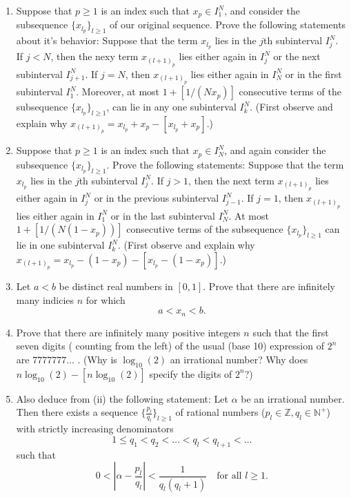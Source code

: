 \documentclass[11pt]{article}
\begin{document}
\begin{enumerate}[leftmargin=0pt, label=\arabic*)]
\begin{enumerate}[label=(\roman*)]
   \item Suppose that \(p \geq 1\) is an index such that \(x_p \in I_1^N\), and consider the subsequence 
     \(\{x_{l_p}\}_{l \geq 1}\) of our original sequence.  Prove the following statements about it's 
     behavior:  Suppose that the term \(x_{l_p}\) lies in the \(j\)th subinterval \(I_j^N\).  If \(j < N\),
     then the nexy term  \(x_{(l+1)_p}\) lies either again in \(I_j^N\) or the next subinterval \(I_{j+1}^N\). 
     If \(j = N\), then \(x_{(l+1)_p}\) lies either again in \(I_N^N\) or in the first subinterval \(I_1^N\). 
     Moreover, at most \(1 + [1/(Nx_p)]\) consecutive terms of the subsequence \(\{x_{l_p}\}_{l \geq 1}\), 
     can lie in any one subinterval \(I_k^N\).  (First observe and explain why \(
     x_{(l+1)_p} = x_{l_p} + x_p - [x_{l_p} + x_p]\).)

   \item Suppose that \(p \geq 1\) is an index such that \(x_p \in I_N^N\), and again consider the 
     subsequence \(\{x_{l_p}\}_{l \geq 1}\).  Prove the following statements: Suppose that the term 
     \(x_{l_p}\) lies in the \(j\)th subinterval \(I_j^N\).  If \(j > 1\), then the next term \(x_{(l+1)_p}\) 
     lies either again in \(I_j^N\) or in the previous subinterval \(I_{j-1}^N\).  If \(j = 1\), then 
     \(x_{(l+1)_p}\) lies either again in \(I_1^N\) or in the last subinterval \(I_N^N\).  At most 
     \(1 + [1/(N(1 - x_p))]\) consecutive terms of the subsequence \(\{x_{l_p}\}_{l \geq 1}\) can lie in 
     one subinterval \(I_k^N\).  (First observe and explain why \(x_{(l+1)_p} = x_{l_p} - (1 - x_p) - 
     [x_{l_p} - (1 - x_p)]\).)

   \item Let \(a < b\) be distinct real numbers in \([0,1]\). Prove that there are infinitely many indicies 
     \(n\) for which \[a < x_n < b.\]

    
   \item Prove that there are infinitely many positive integers \(n\) such that the first seven digits (
     counting from the left) of the usual (base 10) expression of \(2^n\) are \(7777777\dots\) .
     (Why is \(\log_{10}(2)\) an irrational number? Why does \(n\log_{10}(2) - [n\log_{10}(2)]\) specify 
     the digits of \(2^n\)?)
     \newpage

   \item Also deduce from (ii) the following statement: Let \(\alpha\) be an irrational number.  Then there 
     exists a sequence \(\big\{\frac{p_l}{q_l}\big\}_{l \geq 1}\) of rational numbers (\(p_l \in \mathbb{Z}, 
     q_l \in \mathbb{N^+}\)) with strictly increasing denominators 
     \[1 \leq q_1 < q_2 < \hdots < q_l < q_{l+1} < \hdots\]
     such that 
     \[0 < \left|\alpha - \frac{p_l}{q_l}\right| < \frac{1}{q_l(q_l + 1)} \quad \text{for all } l \geq 1.\]
  \end{enumerate}
  \newpage


\end{enumerate}
\end{document}
